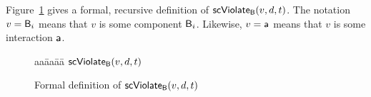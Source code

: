 \en
%
Figure~\ref{fig:scViolate} gives a formal, recursive definition of $\mathsf{scViolate}_{\mathsf{B}}(v,d,t)$. 
The notation $v = \mathsf{B}_i$ means that $v$ is some component $\mathsf{B}_i$. Likewise, 
$v = \mathsf{a}$ means that $v$ is some interaction $\mathsf{a}$.
\ed



\begin{figure}[ht]

\setcounter{lctr}{-1}
\begin{tabbing}\label{alg:check-scViol}
aa\= aa\= aa\= \kill
$\mathsf{scViolate}_{\mathsf{B}}(v,d,t)$\\
\end{tabbing}
\vspace{-6ex}
\caption{Formal definition of $\mathsf{scViolate}_{\mathsf{B}}(v,d,t)$}
\label{fig:scViolate}
\end{figure}










